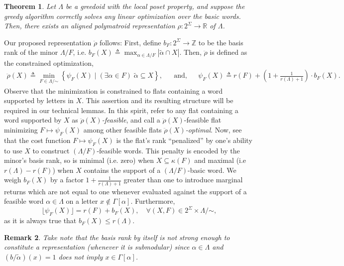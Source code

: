 \documentclass[11pt]{article}
\newtheorem{theorem}{Theorem}[section]
\newtheorem{remark}[theorem]{Remark}
\newcommand{\univ}{\Sigma}
\newcommand{\glang}{\Lambda}
\newcommand{\greedyrep}{\ddot{\rho}}
\begin{document}
\begin{theorem}\label{thm:lp-greedy=>pm-greedoid}
    Let $\glang$ be a greedoid with the local poset property,
    and suppose the greedy algorithm correctly solves any linear optimization over the basic words.
    Then, there exists an aligned polymatroid representation $\rho:2^\univ\to\mathbb{R}$ of $\glang$.
\end{theorem}

Our proposed representation $\greedyrep$ follows: First, define $b_F:2^\univ\to\mathbb{Z}$ to be the basis rank of the minor $\glang/F$, i.e. $b_F(X)\triangleq \max_{\alpha\in\glang/F}|\widetilde{\alpha}\cap X|.$
Then, $\greedyrep$ is defined as the constrained optimization,
\begin{align*}
    \greedyrep(X) \triangleq \min_{F\in\glang/\mathord{\sim}}\left\{\psi_F(X)\mid (\exists \alpha \in F)\;\widetilde{\alpha}\subseteq X\right\},&&\text{and},&&\psi_F(X) \triangleq r(F) + \left(1+\frac{1}{r(\glang)+1}\right)\cdot b_F(X).
\end{align*}
Observe that the minimization is constrained to flats containing a word supported by letters in $X$.
This assertion and its resulting structure will be required in our technical lemmas.
In this spirit, refer to any flat containing a word supported by $X$ as \emph{$\greedyrep(X)$-feasible}, and call a $\greedyrep(X)$-feasible flat minimizing $F\mapsto \psi_F(X)$ among other feasible flats \emph{$\greedyrep(X)$-optimal}.
Now, see that the cost function $F\mapsto\psi_F(X)$ is the flat's rank ``penalized'' by one's ability to use $X$ to construct $(\glang/F)$-feasible words.
This penalty is encoded by the minor's basis rank, so is minimal (i.e. zero) when $X\subseteq\kappa(F)$ and maximal (i.e $r(\glang)-r(F)$) when $X$ contains the support of a $(\glang/F)$-basic word.
We weigh $b_F(X)$ by a factor $1+\frac{1}{r(\glang)+1}$ greater than one to introduce marginal returns which are not equal to one whenever evaluated against the support of a feasible word $\alpha\in\glang$ on a letter $x\notin\Gamma[\alpha]$.
Furthermore,
\begin{equation}\label{eq:floor-psi}
    \lfloor \psi_F(X) \rfloor = r(F) + b_F(X),\quad\forall (X,F) \in 2^\univ\times\glang/\mathord{\sim},
\end{equation}
as it is always true that $b_F(X) \leq r(\glang)$.

\begin{remark}
    Take note that the basis rank by itself is not strong enough to constitute a representation (whenever it is submodular) since $\alpha\in\glang$ and $(b/\widetilde{\alpha})(x)=1$ does not imply $x \in\Gamma[\alpha]$.
\end{remark}
\end{document}
